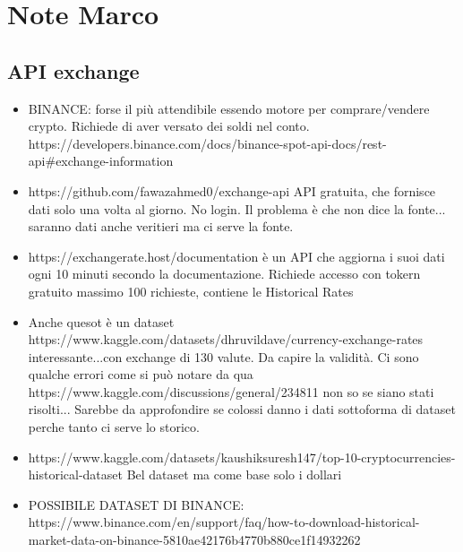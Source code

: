 \documentclass[12pt, letterpaper]{article}
\begin{document}
	

	
	
	
	

	\section{Note Marco}
	\subsection{API exchange}
	\begin{itemize}
		\item BINANCE: forse il più attendibile essendo motore per comprare/vendere crypto. Richiede di aver versato dei soldi nel conto.
		https://developers.binance.com/docs/binance-spot-api-docs/rest-api#exchange-information
		\item https://github.com/fawazahmed0/exchange-api API gratuita, che fornisce dati solo una volta al giorno. No login. Il problema è che non dice la fonte...
		saranno dati anche veritieri ma ci serve la fonte.
		\item https://exchangerate.host/documentation è un API che aggiorna i suoi dati ogni 10 minuti secondo la documentazione. Richiede accesso con tokern gratuito massimo
		100 richieste, contiene le Historical Rates 
		\item Anche quesot è un dataset https://www.kaggle.com/datasets/dhruvildave/currency-exchange-rates interessante...con exchange di 130 valute. Da capire la validità. Ci sono qualche errori come si può notare da qua https://www.kaggle.com/discussions/general/234811 non so se siano stati risolti...
		Sarebbe da approfondire se colossi danno i dati sottoforma di dataset perche tanto ci serve lo storico. 
		\item https://www.kaggle.com/datasets/kaushiksuresh147/top-10-cryptocurrencies-historical-dataset Bel dataset ma come base solo i dollari
		\item POSSIBILE DATASET DI BINANCE: https://www.binance.com/en/support/faq/how-to-download-historical-market-data-on-binance-5810ae42176b4770b880ce1f14932262
	\end{itemize}
	
	
\end{document}
